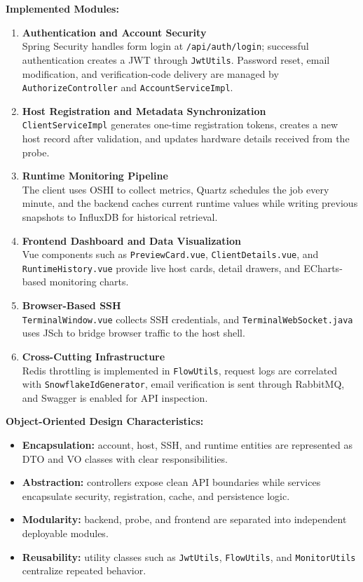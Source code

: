 \documentclass[11pt,a4paper]{article}
\begin{document}
\textbf{Implemented Modules:}
\begin{enumerate}
  \item \textbf{Authentication and Account Security} \\
  Spring Security handles form login at \texttt{/api/auth/login}; successful authentication creates a JWT through \texttt{JwtUtils}. Password reset, email modification, and verification-code delivery are managed by \texttt{AuthorizeController} and \texttt{AccountServiceImpl}.

  \item \textbf{Host Registration and Metadata Synchronization} \\
  \texttt{ClientServiceImpl} generates one-time registration tokens, creates a new host record after validation, and updates hardware details received from the probe.

  \item \textbf{Runtime Monitoring Pipeline} \\
  The client uses OSHI to collect metrics, Quartz schedules the job every minute, and the backend caches current runtime values while writing previous snapshots to InfluxDB for historical retrieval.

  \item \textbf{Frontend Dashboard and Data Visualization} \\
  Vue components such as \texttt{PreviewCard.vue}, \texttt{ClientDetails.vue}, and \texttt{RuntimeHistory.vue} provide live host cards, detail drawers, and ECharts-based monitoring charts.

  \item \textbf{Browser-Based SSH} \\
  \texttt{TerminalWindow.vue} collects SSH credentials, and \texttt{TerminalWebSocket.java} uses JSch to bridge browser traffic to the host shell.

  \item \textbf{Cross-Cutting Infrastructure} \\
  Redis throttling is implemented in \texttt{FlowUtils}, request logs are correlated with \texttt{SnowflakeIdGenerator}, email verification is sent through RabbitMQ, and Swagger is enabled for API inspection.
\end{enumerate}

\textbf{Object-Oriented Design Characteristics:}
\begin{itemize}
  \item \textbf{Encapsulation:} account, host, SSH, and runtime entities are represented as DTO and VO classes with clear responsibilities.
  \item \textbf{Abstraction:} controllers expose clean API boundaries while services encapsulate security, registration, cache, and persistence logic.
  \item \textbf{Modularity:} backend, probe, and frontend are separated into independent deployable modules.
  \item \textbf{Reusability:} utility classes such as \texttt{JwtUtils}, \texttt{FlowUtils}, and \texttt{MonitorUtils} centralize repeated behavior.
\end{itemize}
\end{document}
